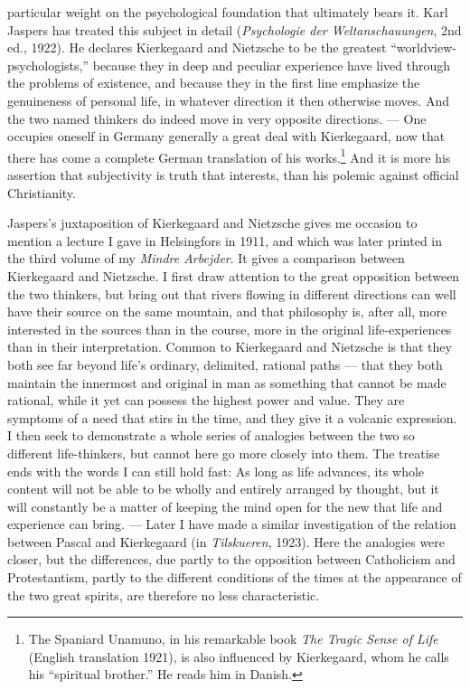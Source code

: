 \documentclass[12pt]{book}
\newcommand{\opage}[1]{\marginnote{\footnotesize\textit{[#1]}}}
\begin{document}
particular weight on the psychological foundation that ultimately bears it. Karl Jaspers has treated this
subject in detail (\textit{Psychologie der Weltanschauungen}, 2nd ed., 1922). He declares Kierkegaard and
Nietzsche to be the greatest ``worldview-psychologists,'' because they in deep and peculiar experience
have lived through the problems of existence, and because they in the first line emphasize the
genuineness of personal life, in whatever direction it then otherwise moves. And the two named thinkers
do indeed move in very opposite directions. --- One occupies oneself in Germany generally a great deal
with Kierkegaard, now that there has come a complete German translation of his \opage{51}works.\footnote{The
Spaniard Unamuno, in his remarkable book \textit{The Tragic Sense of Life} (English translation 1921), is
also influenced by Kierkegaard, whom he calls his ``spiritual brother.'' He reads him in Danish.} And it
is more his assertion that subjectivity is truth that interests, than his polemic against official
Christianity.

Jaspers's juxtaposition of Kierkegaard and Nietzsche gives me occasion to mention a lecture I gave in
Helsingfors in 1911, and which was later printed in the third volume of my \textit{Mindre Arbejder}. It
gives a comparison between Kierkegaard and Nietzsche. I first draw attention to the great opposition
between the two thinkers, but bring out that rivers flowing in different directions can well have their
source on the same mountain, and that philosophy is, after all, more interested in the sources than in
the course, more in the original life-experiences than in their interpretation. Common to Kierkegaard and
Nietzsche is that they both see far beyond life's ordinary, delimited, rational paths --- that they both
maintain the innermost and original in man as something that cannot be made rational, while it yet can
possess the highest power and value. They are symptoms of a need that stirs in the time, and they give it
a volcanic expression. I then seek to demonstrate a whole series of analogies between the two so different
life-thinkers, but cannot here go more closely into them. The treatise ends with the words I can still
hold fast: As long as life advances, its whole content will not be able to be wholly and entirely
arranged by thought, but it will constantly be a matter of keeping the mind open for the new that life and
experience can bring. --- Later I have made a similar investigation of the relation between \opage{52}Pascal and
Kierkegaard (in \textit{Tilskueren}, 1923). Here the analogies were closer, but the differences, due
partly to the opposition between Catholicism and Protestantism, partly to the different conditions of the
times at the appearance of the two great spirits, are therefore no less characteristic.
\end{document}
